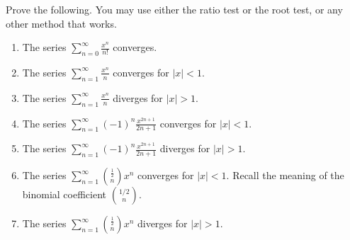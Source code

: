 Prove the following. You may use either the ratio test or the root test, or any other method that works.
\begin{enumerate}
\item The series 
$\sum\limits_{n=0}^{\infty} \frac{x^n}{n!}$
converges.
\item The series 
$\sum\limits_{n=1}^{\infty} \frac{x^n}{n} $
converges for $|x|<1$.
\item The series 
$\sum\limits_{n=1}^{\infty} \frac{x^n}{n}$
diverges for $|x|>1$.
\item The series 
$\sum\limits_{n=1}^{\infty} (-1)^n\frac{x^{2n+1}}{2n+1}$
converges for $|x|<1$.
\item The series 
$\sum\limits_{n=1}^{\infty} (-1)^n\frac{x^{2n+1}}{2n+1}$
diverges for $|x|>1$.
\item The series 
$\sum\limits_{n=1}^{\infty} \binom{\frac{1}{2}}{n}x^{n}$
converges for $|x|<1$. Recall the meaning of the binomial coefficient $\binom{1/2}{n}$.
\item The series 
$\sum\limits_{n=1}^{\infty} \binom{\frac{1}{2}}{n}x^{n}$
diverges for $|x|>1$.
\end{enumerate}